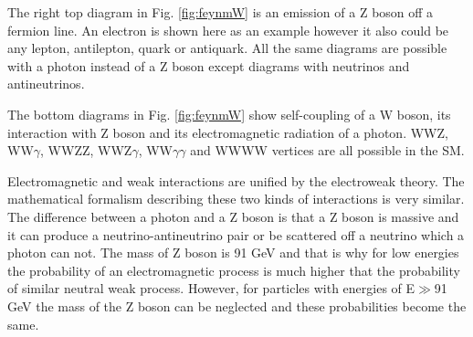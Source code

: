 The right top diagram in Fig. \ref{fig:feynmW} is an emission of a Z boson off a fermion line. An electron is shown here as an example however it also could be any lepton, antilepton, quark or antiquark. All the same diagrams are possible with a photon instead of a Z boson except diagrams with neutrinos and antineutrinos.

The bottom diagrams in Fig. \ref{fig:feynmW} show self-coupling of a W boson, its interaction with Z boson and its electromagnetic radiation of a photon. WWZ, WW$\gamma$, WWZZ, WWZ$\gamma$, WW$\gamma\gamma$ and WWWW vertices are all possible in the SM.

Electromagnetic and weak interactions are unified by the electroweak theory. The mathematical formalism describing these two kinds of interactions is very similar. The difference between a photon and a Z boson is that a Z boson is massive and it can produce a neutrino-antineutrino pair or be scattered off a neutrino which a photon can not. The mass of Z boson is 91 GeV and that is why for low energies the probability of an electromagnetic process is much higher that the probability of similar neutral weak process. However, for particles with energies of E$\gg$91 GeV the mass of the Z boson can be neglected and these probabilities become the same. 
